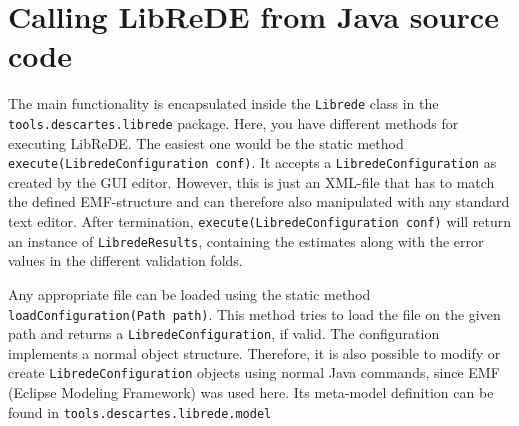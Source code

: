 \section{Calling LibReDE from Java source code}
The main functionality is encapsulated inside the \texttt{Librede} class in the \texttt{tools.descartes.librede} package. 
Here, you have different methods for executing LibReDE. 
The easiest one would be the static method \texttt{execute(LibredeConfiguration conf)}. 
It accepts a \texttt{LibredeConfiguration} as created by the GUI editor. However, this is just an XML-file that has to match the defined EMF-structure and can therefore also manipulated with any standard text editor.
After termination, \texttt{execute(LibredeConfiguration conf)} will return an instance of \texttt{LibredeResults}, containing the estimates along with the error values in the different validation folds.

Any appropriate file can be loaded using the static method \texttt{loadConfiguration(Path path)}. This method tries to load the file on the given path and returns a \texttt{LibredeConfiguration}, if valid. 
The configuration implements a normal object structure.
Therefore, it is also possible to modify or create \texttt{LibredeConfiguration} objects using normal Java commands, since EMF (Eclipse Modeling Framework) was used here.
Its meta-model definition can be found in \texttt{tools.descartes.librede.model}



